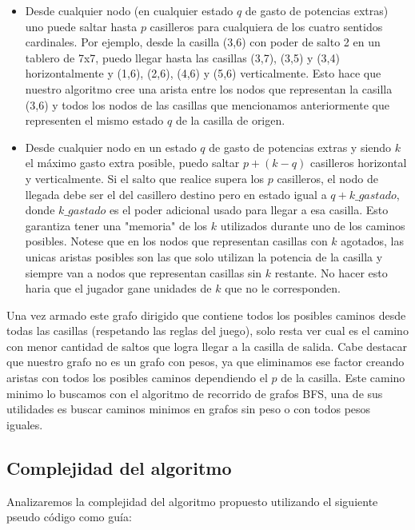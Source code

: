 \begin{itemize}
\item Desde cualquier nodo (en cualquier estado $q$ de gasto de potencias extras) uno puede saltar hasta $p$ casilleros para cualquiera de los cuatro sentidos cardinales. Por ejemplo, desde la casilla (3,6) con poder de salto 2 en un tablero de 7x7, puedo llegar hasta las casillas (3,7), (3,5) y (3,4) horizontalmente y (1,6), (2,6), (4,6) y (5,6) verticalmente. Esto hace que nuestro algoritmo cree una arista entre los nodos que representan la casilla (3,6) y todos los nodos de las casillas que mencionamos anteriormente que representen el mismo estado $q$ de la casilla de origen.
\item Desde cualquier nodo en un estado $q$ de gasto de potencias extras y siendo $k$ el m\'aximo gasto extra posible, puedo saltar $p+(k-q)$ casilleros horizontal y verticalmente. Si el salto que realice supera los $p$ casilleros, el nodo de llegada debe ser el del casillero destino pero en estado igual a $q+k\_gastado$, donde $k\_gastado$ es el poder adicional usado para llegar a esa casilla. Esto garantiza tener una "memoria" de los $k$ utilizados durante uno de los caminos posibles. Notese que en los nodos que representan casillas con $k$ agotados, las unicas aristas posibles son las que solo utilizan la potencia de la casilla y siempre van a nodos que representan casillas sin $k$ restante. No hacer esto haria que el jugador gane unidades de $k$ que no le corresponden.
\end{itemize}

Una vez armado este grafo dirigido que contiene todos los posibles caminos desde todas las casillas (respetando las reglas del juego), solo resta ver cual es el camino con menor cantidad de saltos que logra llegar a la casilla de salida. Cabe destacar que nuestro grafo no es un grafo con pesos, ya que eliminamos ese factor creando aristas con todos los posibles caminos dependiendo el $p$ de la casilla. Este camino minimo lo buscamos con el algoritmo de recorrido de grafos BFS, una de sus utilidades es buscar caminos minimos en grafos sin peso o con todos pesos iguales.

\newpage
\subsection{Complejidad del algoritmo}

Analizaremos la complejidad del algoritmo propuesto utilizando el siguiente pseudo c\'odigo como gu\'ia:

